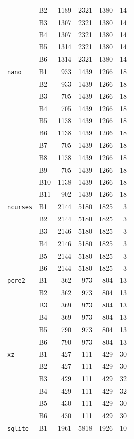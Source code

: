 \begin{table}[t]
\begin{tabular}{llrrrr}
& B2 & 1189 & 2321 & 1380 & 14 \\
& B3 & 1307 & 2321 & 1380 & 14 \\
& B4 & 1307 & 2321 & 1380 & 14 \\
& B5 & 1314 & 2321 & 1380 & 14 \\
& B6 & 1314 & 2321 & 1380 & 14 \\
\midrule
\texttt{nano}
& B1 & 933 & 1439 & 1266 & 18 \\
& B2 & 933 & 1439 & 1266 & 18 \\
& B3 & 705 & 1439 & 1266 & 18 \\
& B4 & 705 & 1439 & 1266 & 18 \\
& B5 & 1138 & 1439 & 1266 & 18 \\
& B6 & 1138 & 1439 & 1266 & 18 \\
& B7 & 705 & 1439 & 1266 & 18 \\
& B8 & 1138 & 1439 & 1266 & 18 \\
& B9 & 705 & 1439 & 1266 & 18 \\
& B10 & 1138 & 1439 & 1266 & 18 \\
& B11 & 902 & 1439 & 1266 & 18 \\
\midrule
\texttt{ncurses}
& B1 & 2144 & 5180 & 1825 & 3 \\
& B2 & 2144 & 5180 & 1825 & 3 \\
& B3 & 2146 & 5180 & 1825 & 3 \\
& B4 & 2146 & 5180 & 1825 & 3 \\
& B5 & 2144 & 5180 & 1825 & 3 \\
& B6 & 2144 & 5180 & 1825 & 3 \\
\midrule
\texttt{pcre2}
& B1 & 362 & 973 & 804 & 13 \\
& B2 & 362 & 973 & 804 & 13 \\
& B3 & 369 & 973 & 804 & 13 \\
& B4 & 369 & 973 & 804 & 13 \\
& B5 & 790 & 973 & 804 & 13 \\
& B6 & 790 & 973 & 804 & 13 \\
\midrule
\texttt{xz}
& B1 & 427 & 111 & 429 & 30 \\
& B2 & 427 & 111 & 429 & 30 \\
& B3 & 429 & 111 & 429 & 32 \\
& B4 & 429 & 111 & 429 & 32 \\
& B5 & 430 & 111 & 429 & 30 \\
& B6 & 430 & 111 & 429 & 30 \\
\midrule
\texttt{sqlite}
& B1 & 1961 & 5818 & 1926 & 10 \\

\end{tabular}
\end{table}
